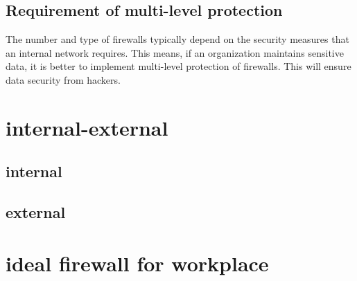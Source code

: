 \documentclass[a4paper,12pt]{book}
\begin{document}
\subsection{Requirement of multi-level protection}
The number and type of firewalls typically depend on the security measures that an internal network requires. This means, if an organization maintains sensitive data, it is better to implement multi-level protection of firewalls. This will ensure data security from hackers.\section{internal-external}

\subsection{internal}
\subsection{external}

\section{ideal firewall for workplace}
\end{document}
